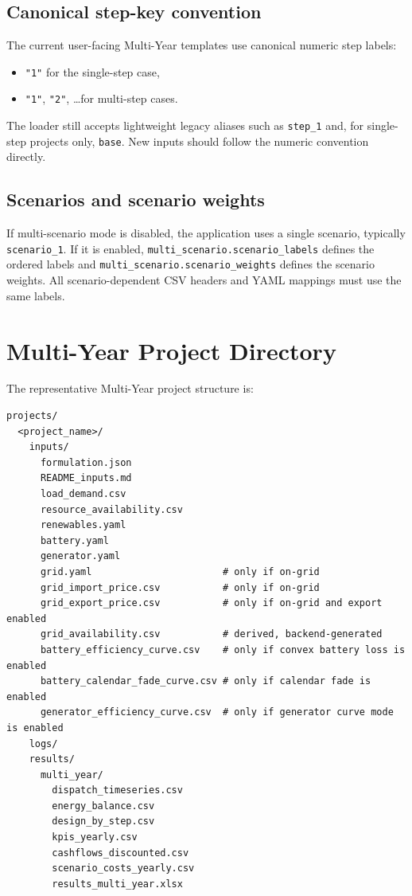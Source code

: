\documentclass[11pt,a4paper]{report}
\newcommand{\code}[1]{\texttt{#1}}
\begin{document}
\section{Canonical step-key convention}

The current user-facing Multi-Year templates use canonical numeric step labels:

\begin{itemize}[leftmargin=1.5em]
  \item \code{"1"} for the single-step case,
  \item \code{"1"}, \code{"2"}, \dots for multi-step cases.
\end{itemize}

The loader still accepts lightweight legacy aliases such as \code{step\_1} and, for single-step projects only, \code{base}. New inputs should follow the numeric convention directly.

\section{Scenarios and scenario weights}

If multi-scenario mode is disabled, the application uses a single scenario, typically \code{scenario\_1}. If it is enabled, \code{multi\_scenario.scenario\_labels} defines the ordered labels and \code{multi\_scenario.scenario\_weights} defines the scenario weights. All scenario-dependent CSV headers and YAML mappings must use the same labels.

\chapter{Multi-Year Project Directory}\label{sec:multi-year-directory}

The representative Multi-Year project structure is:

\begin{lstlisting}[style=mgpy]
projects/
  <project_name>/
    inputs/
      formulation.json
      README_inputs.md
      load_demand.csv
      resource_availability.csv
      renewables.yaml
      battery.yaml
      generator.yaml
      grid.yaml                       # only if on-grid
      grid_import_price.csv           # only if on-grid
      grid_export_price.csv           # only if on-grid and export enabled
      grid_availability.csv           # derived, backend-generated
      battery_efficiency_curve.csv    # only if convex battery loss is enabled
      battery_calendar_fade_curve.csv # only if calendar fade is enabled
      generator_efficiency_curve.csv  # only if generator curve mode is enabled
    logs/
    results/
      multi_year/
        dispatch_timeseries.csv
        energy_balance.csv
        design_by_step.csv
        kpis_yearly.csv
        cashflows_discounted.csv
        scenario_costs_yearly.csv
        results_multi_year.xlsx
\end{lstlisting}
\end{document}
